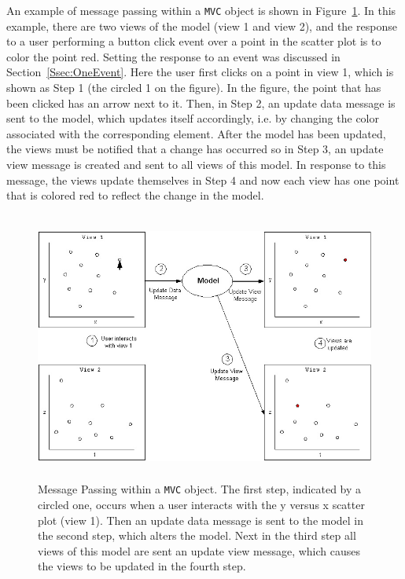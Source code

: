 \documentclass[11pt]{article}
\newcommand{\Robject}[1]{{\texttt{#1}}}
\begin{document}
An example of message passing within a \Robject{MVC} object is shown
in Figure~\ref{Fig:MPwithin}.  In this example, there are two views of the
model (view 1 and view 2), and the response to a user
performing a button click event over a point in the scatter plot is to
color the point red.  Setting the response to an event was discussed
in Section~\ref{Ssec:OneEvent}.  Here the user first clicks on a point
in view 1, which is shown as Step 1 (the circled 1 on the
figure).  In the figure, the point that has been clicked has an arrow
next to it.  Then, in Step 2, an update data message is sent to the
model, which updates itself accordingly, i.e. by changing the color
associated with the corresponding element.  After the model has been
updated, the views must be notified that a change has occurred so in
Step 3, an update view message is created and sent to all views of
this model.  In response to this message, the views update themselves in
Step 4 and now each view has one point that is colored red to reflect the
change in the model.

\begin{figure}[ht]
  \begin{center}
    \includegraphics[height=3.5in, width=5in]{newMPwithin2.jpg}
    \caption{ Message Passing within a \Robject{MVC} object.  The first step,
      indicated by a circled one, occurs when a user interacts with the y
      versus x scatter plot (view 1).  Then an update data message is sent to
      the model in the second step, which alters the model.  Next in the third
      step all views of this model are sent an update view message, which
      causes the views to be updated in the fourth step. }
    \label{Fig:MPwithin}
  \end{center}
\end{figure}
\end{document}
